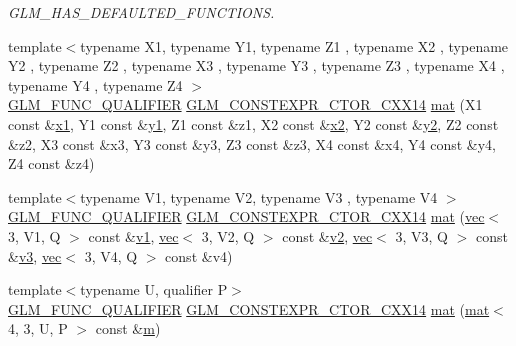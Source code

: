 \begin{DoxyCompactItemize}
\begin{DoxyCompactList}\small\item\em G\+L\+M\+\_\+\+H\+A\+S\+\_\+\+D\+E\+F\+A\+U\+L\+T\+E\+D\+\_\+\+F\+U\+N\+C\+T\+I\+O\+NS. \end{DoxyCompactList}\item 
{\footnotesize template$<$typename X1, typename Y1, typename Z1 , typename X2 , typename Y2 , typename Z2 , typename X3 , typename Y3 , typename Z3 , typename X4 , typename Y4 , typename Z4 $>$ }\\\mbox{\hyperlink{setup_8hpp_a33fdea6f91c5f834105f7415e2a64407}{G\+L\+M\+\_\+\+F\+U\+N\+C\+\_\+\+Q\+U\+A\+L\+I\+F\+I\+ER}} \mbox{\hyperlink{setup_8hpp_a0900f9145e68bf6061b6f5e7be3fa751}{G\+L\+M\+\_\+\+C\+O\+N\+S\+T\+E\+X\+P\+R\+\_\+\+C\+T\+O\+R\+\_\+\+C\+X\+X14}} \mbox{\hyperlink{structglm_1_1mat_3_014_00_013_00_01_t_00_01_q_01_4_a97ef5af99c1162296ecfe810c2d8a4b1}{mat}} (X1 const \&\mbox{\hyperlink{_s_d_l__opengl__glext_8h_a49825216c96caaeb09237b36651181c5}{x1}}, Y1 const \&\mbox{\hyperlink{_s_d_l__opengl__glext_8h_a3af6c78fcdfccea028a5878bc747ef39}{y1}}, Z1 const \&z1, X2 const \&\mbox{\hyperlink{_s_d_l__opengl__glext_8h_a7b907a03236685c534d89d604cff23c8}{x2}}, Y2 const \&\mbox{\hyperlink{_s_d_l__opengl__glext_8h_a2be1135ed68e8d80fa9e130c7814f8c2}{y2}}, Z2 const \&z2, X3 const \&x3, Y3 const \&y3, Z3 const \&z3, X4 const \&x4, Y4 const \&y4, Z4 const \&z4)
\item 
{\footnotesize template$<$typename V1, typename V2, typename V3 , typename V4 $>$ }\\\mbox{\hyperlink{setup_8hpp_a33fdea6f91c5f834105f7415e2a64407}{G\+L\+M\+\_\+\+F\+U\+N\+C\+\_\+\+Q\+U\+A\+L\+I\+F\+I\+ER}} \mbox{\hyperlink{setup_8hpp_a0900f9145e68bf6061b6f5e7be3fa751}{G\+L\+M\+\_\+\+C\+O\+N\+S\+T\+E\+X\+P\+R\+\_\+\+C\+T\+O\+R\+\_\+\+C\+X\+X14}} \mbox{\hyperlink{structglm_1_1mat_3_014_00_013_00_01_t_00_01_q_01_4_a51464174c591e7c9c6feea63148a686c}{mat}} (\mbox{\hyperlink{structglm_1_1vec}{vec}}$<$ 3, V1, Q $>$ const \&\mbox{\hyperlink{_s_d_l__opengl__glext_8h_a435c176a02c061b43e19bdf7c86cceae}{v1}}, \mbox{\hyperlink{structglm_1_1vec}{vec}}$<$ 3, V2, Q $>$ const \&\mbox{\hyperlink{_s_d_l__opengl__glext_8h_a0928f6d0f0f794ba000a21dfae422136}{v2}}, \mbox{\hyperlink{structglm_1_1vec}{vec}}$<$ 3, V3, Q $>$ const \&\mbox{\hyperlink{_s_d_l__opengl__glext_8h_acc806b31cbf466ceba6555983d8b814d}{v3}}, \mbox{\hyperlink{structglm_1_1vec}{vec}}$<$ 3, V4, Q $>$ const \&v4)
\item 
{\footnotesize template$<$typename U, qualifier P$>$ }\\\mbox{\hyperlink{setup_8hpp_a33fdea6f91c5f834105f7415e2a64407}{G\+L\+M\+\_\+\+F\+U\+N\+C\+\_\+\+Q\+U\+A\+L\+I\+F\+I\+ER}} \mbox{\hyperlink{setup_8hpp_a0900f9145e68bf6061b6f5e7be3fa751}{G\+L\+M\+\_\+\+C\+O\+N\+S\+T\+E\+X\+P\+R\+\_\+\+C\+T\+O\+R\+\_\+\+C\+X\+X14}} \mbox{\hyperlink{structglm_1_1mat_3_014_00_013_00_01_t_00_01_q_01_4_a8227f64e941f2a66f0ac66efde15e224}{mat}} (\mbox{\hyperlink{structglm_1_1mat}{mat}}$<$ 4, 3, U, P $>$ const \&\mbox{\hyperlink{_s_d_l__opengl__glext_8h_af593500c283bf1a787a6f947f503a5c2}{m}})

\end{DoxyCompactItemize}
